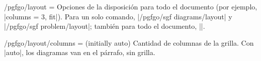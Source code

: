 \begin{codeexample}
\end{codeexample}


\begin{stylekey}{/pgfgo/layout = }
	Opciones de la disposición para todo el documento (por ejemplo, |columns = 3, fit|). Para un solo comando, |/pgfgo/sgf diagrams/layout| y |/pgfgo/sgf problem/layout|; también para todo el documento, ||.
\end{stylekey}

\begin{key}{/pgfgo/layout/columns =  (initially auto)}
	Cantidad de columnas de la grilla. Con |auto|, los diagramas van en el párrafo, sin grilla.
\end{key}

